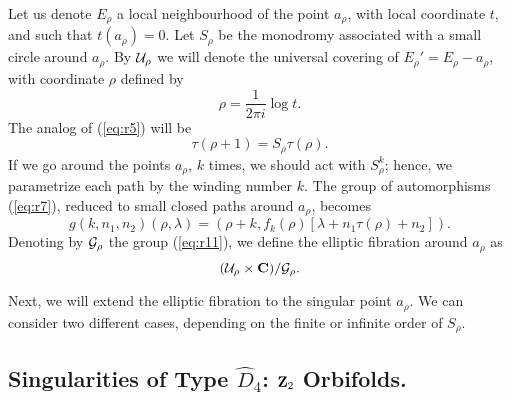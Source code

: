 Let us denote $E_{\rho}$ a local neighbourhood of the point
$a_{\rho}$, with local coordinate $t$, and such that
$t(a_{\rho})=0$. Let $S_{\rho}$ be the monodromy associated with
a small circle around $a_{\rho}$. By ${\cal U}_{\rho}$ we will denote
the universal covering of $E_{\rho}'=E_{\rho}-a_{\rho}$, with
coordinate $\rho$ defined by
\begin{equation}
\rho= \frac {1}{2 \pi i} \log t.
\label{eq:r9}
\end{equation}
The analog of (\ref{eq:r5}) will be
\begin{equation}
\tau(\rho+1) = S_{\rho} \tau(\rho).
\label{eq:r10}
\end{equation}
If we go around the points $a_{\rho}$, $k$ times, we should act
with $S_{\rho}^k$; hence, we parametrize each path by the winding
number $k$. The group of automorphisms (\ref{eq:r7}), reduced to
small closed paths around $a_{\rho}$, becomes
\begin{equation}
g(k,n_1,n_2)(\rho,\lambda) =
(\rho+k,f_k(\rho)[\lambda+n_1\tau(\rho)+n_2]).
\label{eq:r11}
\end{equation}
Denoting by ${\cal G}_{\rho}$ the group (\ref{eq:r11}), we define
the elliptic fibration around $a_{\rho}$ as
\begin{equation}
({\cal U}_{\rho} \times {\bf C})/{\cal G}_{\rho}.
\label{eq:r12}
\end{equation}
  
Next, we will extend the elliptic fibration to the singular point
$a_{\rho}$. We can consider two different cases, depending on the
finite or infinite order of $S_{\rho}$.


\subsection{Singularities of Type $\hat{D}_4$: ${\bf Z}_2$
Orbifolds.}

